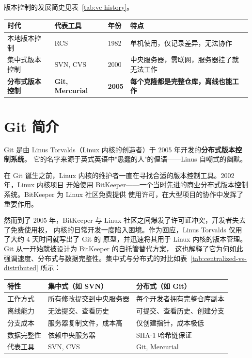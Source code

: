\documentclass[12pt,a4paper,openany]{ctexbook}
\begin{document}
版本控制的发展简史见表~\ref{tab:vc-history}。

\begin{infobox}[boxsep=2mm, left=6mm, right=6mm]
\label{tab:vc-history}

{\renewcommand{\arraystretch}{1.3}\setlength{\tabcolsep}{6pt}\begin{tabularx}{\linewidth}{l l l >{\raggedright\arraybackslash}X}
\toprule
\textbf{时代} & \textbf{代表工具} & \textbf{年份} & \textbf{特点} \\
\midrule
本地版本控制 & RCS & 1982 & 单机使用，仅记录差异，无法协作 \\
集中式版本控制 & SVN, CVS & 2000 & 中央服务器，需联网，服务器挂了就无法工作 \\
\textbf{分布式版本控制} & \textbf{Git, Mercurial} & \textbf{2005} & \textbf{每个克隆都是完整仓库，离线也能工作} \\
\bottomrule
\end{tabularx}}
\end{infobox}

\section{Git 简介}

Git 是由 Linus Torvalds（Linux 内核的创造者）于 2005 年开发的\textbf{分布式版本控制系统}。
它的名字来源于英式英语中"愚蠢的人"的俚语——Linus 自嘲式的幽默。

在 Git 诞生之前，Linux 内核的维护者一直在寻找合适的版本控制工具。2002 年，Linux 内核项目
开始使用 BitKeeper——一个当时先进的商业分布式版本控制系统。BitKeeper 为 Linux 社区免费提供
使用许可，在大型项目的协作中发挥了重要作用。

然而到了 2005 年，BitKeeper 与 Linux 社区之间爆发了许可证冲突，开发者失去了免费使用权，
内核的日常开发一度陷入困境。作为回应，Linus Torvalds 仅用了大约 4 天时间就写出了 Git 的
原型，并迅速将其用于 Linux 内核的版本管理。Git 从一开始就被设计为 BitKeeper 的自托管替代方案，
这也解释了它为何如此强调速度、分布式与数据完整性。集中式与分布式的对比如表~\ref{tab:centralized-vs-distributed} 所示：

\begin{infobox}[boxsep=2mm, left=6mm, right=6mm]
\label{tab:centralized-vs-distributed}
{\renewcommand{\arraystretch}{1.3}\setlength{\tabcolsep}{6pt}\begin{tabularx}{\linewidth}{l >{\raggedright\arraybackslash}X >{\raggedright\arraybackslash}X}
\toprule
\textbf{特性} & \textbf{集中式（如 SVN）} & \textbf{分布式（如 Git）} \\
\midrule
工作方式 & 所有修改提交到中央服务器 & 每个开发者拥有完整仓库副本 \\
离线能力 & 无法提交、查看历史 & 可提交、查看历史、创建分支 \\
分支成本 & 服务器复制文件，成本高 & 仅创建指针，成本极低 \\
数据完整性 & 依赖中央服务器 & SHA-1 哈希链保证 \\
代表工具 & SVN, CVS & Git, Mercurial \\
\bottomrule
\end{tabularx}}
\end{infobox}
\end{document}
